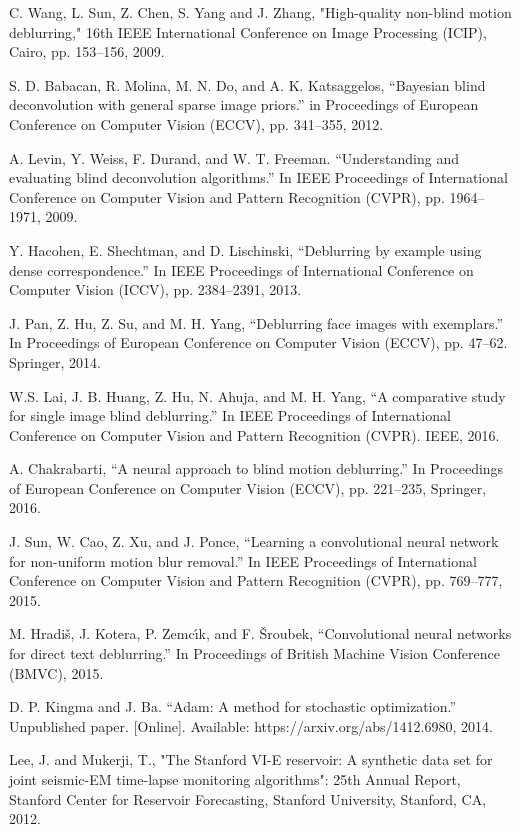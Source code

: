 \documentclass[journal]{IEEEtran}
\begin{document}
\begin{thebibliography}{1}
C. Wang, L. Sun, Z. Chen, S. Yang and J. Zhang, "High-quality non-blind motion deblurring," 16th IEEE International Conference on Image Processing (ICIP), Cairo, pp. 153--156, 2009.

S. D. Babacan, R. Molina, M. N. Do, and A. K. Katsaggelos, ``Bayesian blind deconvolution with general sparse image priors.'' in Proceedings of European Conference on Computer Vision (ECCV), pp. 341--355, 2012.

A. Levin, Y. Weiss, F. Durand, and W. T. Freeman. ``Understanding and evaluating blind deconvolution algorithms.'' In IEEE Proceedings of International Conference on Computer Vision and Pattern Recognition (CVPR), pp. 1964--1971, 2009.

Y. Hacohen, E. Shechtman, and D. Lischinski, ``Deblurring by example using dense correspondence.'' In IEEE Proceedings of International Conference on Computer Vision (ICCV), pp. 2384--2391, 2013.

J. Pan, Z. Hu, Z. Su, and M. H. Yang, ``Deblurring face images with exemplars.'' In Proceedings of European Conference on Computer Vision (ECCV), pp. 47--62. Springer, 2014.

W.S. Lai, J. B. Huang, Z. Hu, N. Ahuja, and M. H. Yang, ``A comparative study for single image blind deblurring.'' In IEEE Proceedings of International Conference on Computer Vision and Pattern Recognition (CVPR). IEEE, 2016.

A. Chakrabarti, ``A neural approach to blind motion deblurring.'' In Proceedings of European Conference on Computer Vision (ECCV), pp. 221--235, Springer, 2016.

J. Sun, W. Cao, Z. Xu, and J. Ponce, ``Learning a convolutional neural network for non-uniform motion blur removal.'' In IEEE Proceedings of International Conference on Computer Vision and Pattern Recognition (CVPR), pp. 769--777, 2015.

M. Hradiš, J. Kotera, P. Zemcı́k, and F. Šroubek, ``Convolutional neural networks for direct text deblurring.'' In Proceedings of British Machine Vision Conference (BMVC), 2015.

D. P. Kingma and J. Ba. “Adam: A method for stochastic optimization.” Unpublished paper. [Online]. Available: https://arxiv.org/abs/1412.6980, 2014.

Lee, J. and Mukerji, T., "The Stanford VI-E reservoir: A synthetic data set for joint seismic-EM time-lapse monitoring algorithms": 25th Annual Report, Stanford Center for Reservoir Forecasting, Stanford University, Stanford, CA, 2012.


\end{thebibliography}
\end{document}
